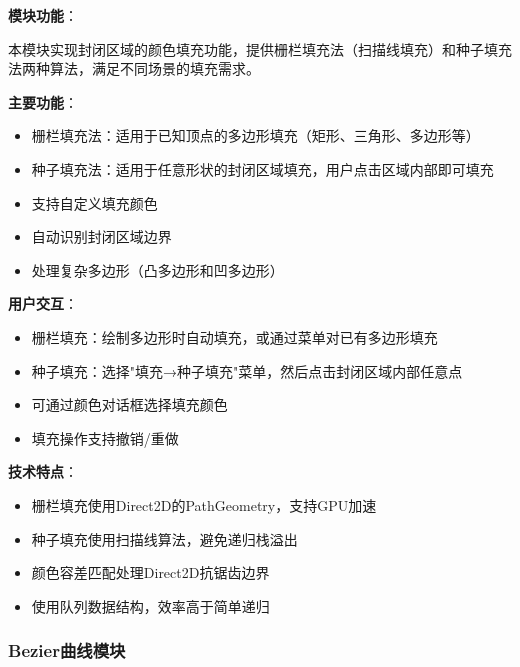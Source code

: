 \documentclass[12pt,a4paper]{article}
\begin{document}
\begin{tcolorbox}
\textbf{模块功能}：

本模块实现封闭区域的颜色填充功能，提供栅栏填充法（扫描线填充）和种子填充法两种算法，满足不同场景的填充需求。

\textbf{主要功能}：
\begin{itemize}
    \item 栅栏填充法：适用于已知顶点的多边形填充（矩形、三角形、多边形等）
    \item 种子填充法：适用于任意形状的封闭区域填充，用户点击区域内部即可填充
    \item 支持自定义填充颜色
    \item 自动识别封闭区域边界
    \item 处理复杂多边形（凸多边形和凹多边形）
\end{itemize}

\textbf{用户交互}：
\begin{itemize}
    \item 栅栏填充：绘制多边形时自动填充，或通过菜单对已有多边形填充
    \item 种子填充：选择"填充→种子填充"菜单，然后点击封闭区域内部任意点
    \item 可通过颜色对话框选择填充颜色
    \item 填充操作支持撤销/重做
\end{itemize}

\textbf{技术特点}：
\begin{itemize}
    \item 栅栏填充使用Direct2D的PathGeometry，支持GPU加速
    \item 种子填充使用扫描线算法，避免递归栈溢出
    \item 颜色容差匹配处理Direct2D抗锯齿边界
    \item 使用队列数据结构，效率高于简单递归
\end{itemize}
\end{tcolorbox}

\subsubsection{Bezier曲线模块}
\end{document}
